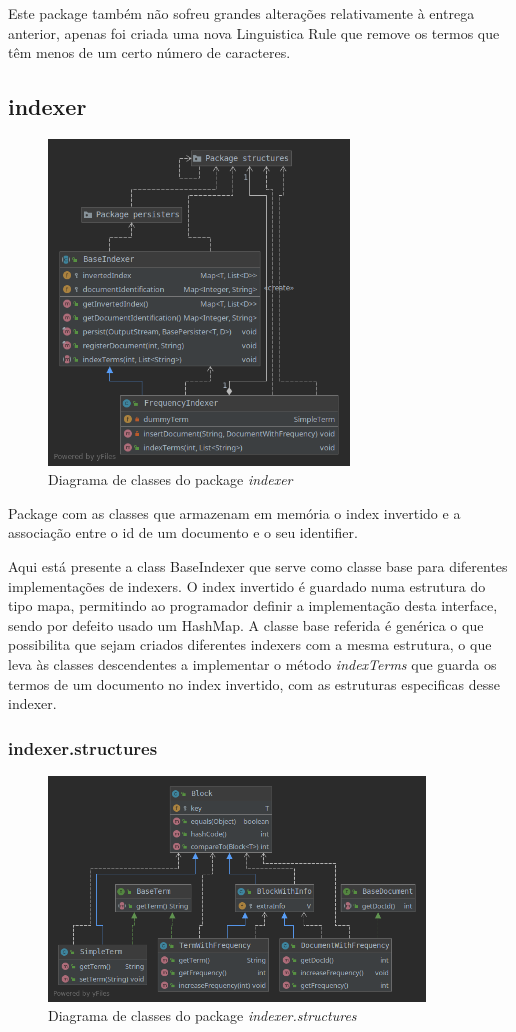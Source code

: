 \documentclass[12pt]{article}
\begin{document}
Este package também não sofreu grandes alterações relativamente à
entrega anterior, apenas foi criada uma nova Linguistica Rule que
remove os termos que têm menos de um certo número de caracteres.

\subsection{indexer}
\begin{figure}[h]
  \center
  \includegraphics[width=8cm]{packages_indexer.png}
  \caption{Diagrama de classes do package \it indexer}
\end{figure}

Package com as classes que armazenam em memória o index invertido e
a associação entre o id de um documento e o seu identifier.

Aqui está presente a class BaseIndexer que serve como classe base para
diferentes implementações de indexers. O index invertido é guardado numa
estrutura do tipo mapa, permitindo ao programador definir a implementação
desta interface, sendo por defeito usado um HashMap. A classe base referida
é genérica o que possibilita que sejam criados diferentes indexers com a
mesma estrutura, o que leva às classes descendentes a implementar o método
{\it indexTerms} que guarda os termos de um documento no index invertido,
com as estruturas especificas desse indexer.

\subsubsection{indexer.structures}
\begin{figure}[h]
  \center
  \includegraphics[width=10cm]{packages_indexer_structures.png}
  \caption{Diagrama de classes do package \it indexer.structures}
\end{figure}
\end{document}
